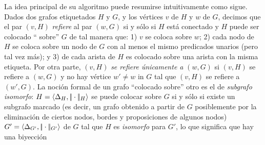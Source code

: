 La idea principal de su algoritmo puede resumirse intuitivamente como sigue.
Dados dos grafos etiquetados $H$ y $G$, y los v\'ertices  $v$ de $H$
y $w$ de $G$, decimos que el par $(v, H)$ {\em refiere}
al par $(w, G)$ si y s\'olo si $H$ est\'a conectado y $H$ puede ser colocado ``
sobre'' $G$ de tal manera que: 1) $v$ se coloca sobre $w$; 2) cada
nodo de $H$ se coloca sobre un nodo de $G$ con al menos el mismo
predicados unarios (pero tal vez m\'as); y 3) de cada arista de $H$ es
colocado sobre una arista con la misma etiqueta. Por otra parte, $(v, H)$ {\em
se refiere \'unicamente a} $(w, G)$ si $(v, H)$ se refiere a $(w, G)$ y no hay
v\'ertice $w'\not=w$ in $G$ tal que $(v, H)$ se refiere a $(w', G)$.
La noci\'on formal de un grafo ``colocado sobre'' otro es el de 
{\em subgrafo isomorfo}:
$H=\langle \Delta_H,|\!|\cdot|\!|_H \rangle$ se puede colocar sobre
$G$ si y s\'olo si existe un subgrafo marcado (es decir, un grafo obtenido a partir de
$G$ posiblemente por la eliminaci\'on de ciertos nodos, bordes y proposiciones de algunos nodos)
$G'=\langle \Delta_{G'},|\!|\cdot|\!|_{G'} \rangle$ de $G$ tal que $H$ es {\em
isomorfo} para ${G'}$, lo que significa que hay una biyecci\'on

